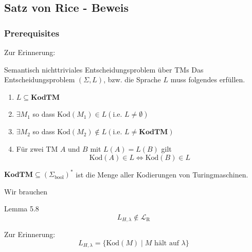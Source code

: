 \documentclass[a4paper, 11pt]{article}
\def\Lr{\mathcal{L}_\text{R}}
\begin{document}
                    \subsection{Satz von Rice - Beweis}

                    
                        \subsubsection{Prerequisites}
                        Zur Erinnerung:
                        \begin{mainbox}{Semantisch nichttriviales Entscheidungsproblem über TMs}
                            Das Entscheidungsproblem $(\Sigma, L)$, bzw. die Sprache $L$ muss folgendes erfüllen.
                            \begin{enumerate}[label=\Roman*.]
                                
                                \item $L \subseteq \textbf{KodTM}$
                                
                                \item $\exists M_1$ so dass $\text{Kod}(M_1) \in L (\text{i.e. } L \neq \emptyset)$
                                \item $\exists M_2$ so dass $\text{Kod}(M_2) \notin L (\text{i.e. } L \neq \textbf{KodTM})$
                                
                                \item Für zwei TM $A$ und $B$ mit $L(A) = L(B)$ gilt
                                $$\text{Kod}(A) \in L \iff \text{Kod}(B) \in L$$
                            \end{enumerate}
                        \end{mainbox}
                        $\textbf{KodTM}\subseteq (\Sigma_{\text{bool}})^*$ ist die Menge aller Kodierungen von Turingmaschinen.
                    
                    
                        Wir brauchen 
                        \begin{mainbox}{Lemma 5.8}
                            $$L_{H, \lambda} \notin \Lr$$
                        \end{mainbox}
                        Zur Erinnerung: 
                        $$L_{H, \lambda} = \{\text{Kod}(M) \mid M \text{ hält auf }\lambda\}$$
                    
                    
                    
\end{document}
